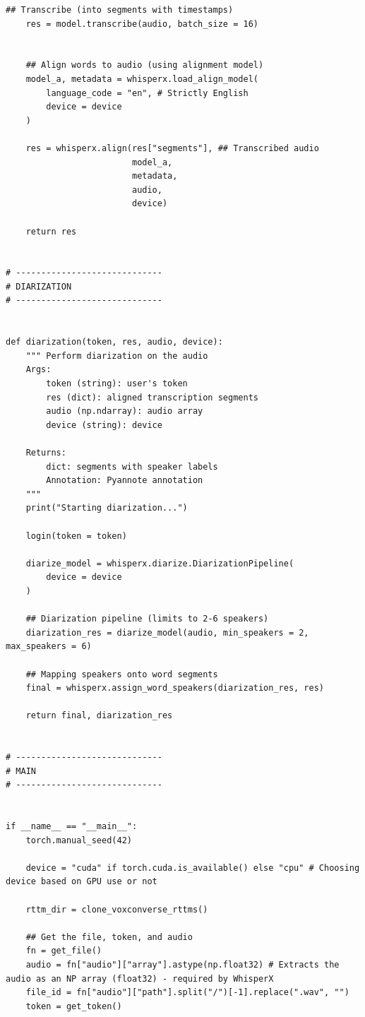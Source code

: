 \documentclass{article}
\begin{document}
\begin{lstlisting}[style=pythonstyle, caption={Simple Diarization (No LLM)}]
    ## Transcribe (into segments with timestamps)
    res = model.transcribe(audio, batch_size = 16) 


    ## Align words to audio (using alignment model)
    model_a, metadata = whisperx.load_align_model( 
        language_code = "en", # Strictly English
        device = device
    )

    res = whisperx.align(res["segments"], ## Transcribed audio
                         model_a, 
                         metadata, 
                         audio, 
                         device)

    return res


# -----------------------------
# DIARIZATION
# -----------------------------


def diarization(token, res, audio, device):
    """ Perform diarization on the audio
    Args:
        token (string): user's token
        res (dict): aligned transcription segments
        audio (np.ndarray): audio array 
        device (string): device
    
    Returns:
        dict: segments with speaker labels
        Annotation: Pyannote annotation 
    """
    print("Starting diarization...")

    login(token = token)

    diarize_model = whisperx.diarize.DiarizationPipeline(
        device = device
    )

    ## Diarization pipeline (limits to 2-6 speakers)
    diarization_res = diarize_model(audio, min_speakers = 2, max_speakers = 6)

    ## Mapping speakers onto word segments
    final = whisperx.assign_word_speakers(diarization_res, res)

    return final, diarization_res


# -----------------------------
# MAIN
# -----------------------------


if __name__ == "__main__":
    torch.manual_seed(42)

    device = "cuda" if torch.cuda.is_available() else "cpu" # Choosing device based on GPU use or not

    rttm_dir = clone_voxconverse_rttms()

    ## Get the file, token, and audio
    fn = get_file()
    audio = fn["audio"]["array"].astype(np.float32) # Extracts the audio as an NP array (float32) - required by WhisperX
    file_id = fn["audio"]["path"].split("/")[-1].replace(".wav", "")
    token = get_token()


\end{lstlisting}
\end{document}
